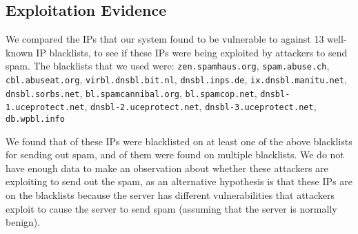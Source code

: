 \subsection{Exploitation Evidence}
We compared the \ips IPs that our system found to be vulnerable to \ehi against 13 well-known IP blacklists, to see if these IPs were being exploited by attackers to send spam. The blacklists that we used were: 
\texttt{zen.spamhaus.org},
\texttt{spam.abuse.ch},
\texttt{cbl.abuseat.org},
\texttt{virbl.dnsbl.bit.nl},
\texttt{dnsbl.inps.de},
\texttt{ix.dnsbl.manitu.net},
\texttt{dnsbl.sorbs.net},
\texttt{bl.spamcannibal.org},
\texttt{bl.spamcop.net},
\texttt{dnsbl-1.uceprotect.net},
\texttt{dnsbl-2.uceprotect.net},
\texttt{dnsbl-3.uceprotect.net},
\texttt{db.wpbl.info}

We found that \ipsblacklist of these IPs were blacklisted on at least one of the above blacklists for sending out spam, and \ipsblacklistmulti of them were found on multiple blacklists. We do not have enough data to make an observation about whether these attackers are exploiting \ehi to send out the spam, as an alternative hypothesis is that these IPs are on the blacklists because the server has different vulnerabilities that attackers exploit to cause the server to send spam (assuming that the server is normally benign).  
